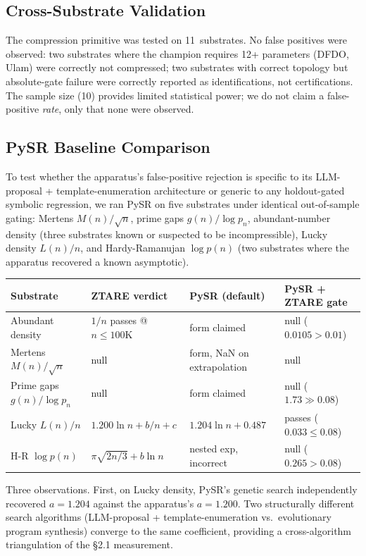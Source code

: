\documentclass[12pt]{article}
\begin{document}
\subsection{Cross-Substrate Validation}

The compression primitive was tested on 11~substrates. No false positives were observed: two substrates where the champion requires 12+ parameters (DFDO, Ulam) were correctly not compressed; two substrates with correct topology but absolute-gate failure were correctly reported as identifications, not certifications. The sample size (10) provides limited statistical power; we do not claim a false-positive \emph{rate}, only that none were observed.

\subsection{PySR Baseline Comparison}
\label{sec:pysr}

To test whether the apparatus's false-positive rejection is specific to its LLM-proposal + template-enumeration architecture or generic to any holdout-gated symbolic regression, we ran PySR \cite{cranmer2023} on five substrates under identical out-of-sample gating: Mertens $M(n)/\sqrt{n}$, prime gaps $g(n)/\log p_n$, abundant-number density (three substrates known or suspected to be incompressible), Lucky density $L(n)/n$, and Hardy-Ramanujan $\log p(n)$ (two substrates where the apparatus recovered a known asymptotic).

\begin{center}
\small
\begin{tabular}{llll}
\toprule
Substrate & ZTARE verdict & PySR (default) & PySR + ZTARE gate \\
\midrule
Abundant density & $1/n$ passes @ $n{\leq}100$K & form claimed & null ($0.0105 > 0.01$) \\
Mertens $M(n)/\sqrt{n}$ & null & form, NaN on extrapolation & null \\
Prime gaps $g(n)/\log p_n$ & null & form claimed & null ($1.73 \gg 0.08$) \\
Lucky $L(n)/n$ & $1.200\ln n + b/n + c$ & $1.204\ln n + 0.487$ & passes ($0.033 \le 0.08$) \\
H-R $\log p(n)$ & $\pi\sqrt{2n/3} + b\ln n$ & nested exp, incorrect & null ($0.265 > 0.08$) \\
\bottomrule
\end{tabular}
\end{center}

Three observations. First, on Lucky density, PySR's genetic search independently recovered $a = 1.204$ against the apparatus's $a = 1.200$. Two structurally different search algorithms (LLM-proposal + template-enumeration vs.\ evolutionary program synthesis) converge to the same coefficient, providing a cross-algorithm triangulation of the \S2.1 measurement.
\end{document}
